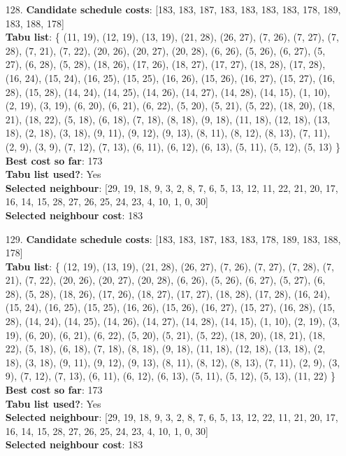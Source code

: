 \documentclass[fleqn]{article}
\begin{document}
\begin{itemize}
    \item[128.] \textbf{Candidate schedule costs}: [183, 183, 187, 183, 183, 183, 183, 178, 189, 183, 188, 178] \\
    \textbf{Tabu list}: \{ (11, 19), (12, 19), (13, 19), (21, 28), (26, 27), (7, 26), (7, 27), (7, 28), (7, 21), (7, 22), (20, 26), (20, 27), (20, 28), (6, 26), (5, 26), (6, 27), (5, 27), (6, 28), (5, 28), (18, 26), (17, 26), (18, 27), (17, 27), (18, 28), (17, 28), (16, 24), (15, 24), (16, 25), (15, 25), (16, 26), (15, 26), (16, 27), (15, 27), (16, 28), (15, 28), (14, 24), (14, 25), (14, 26), (14, 27), (14, 28), (14, 15), (1, 10), (2, 19), (3, 19), (6, 20), (6, 21), (6, 22), (5, 20), (5, 21), (5, 22), (18, 20), (18, 21), (18, 22), (5, 18), (6, 18), (7, 18), (8, 18), (9, 18), (11, 18), (12, 18), (13, 18), (2, 18), (3, 18), (9, 11), (9, 12), (9, 13), (8, 11), (8, 12), (8, 13), (7, 11), (2, 9), (3, 9), (7, 12), (7, 13), (6, 11), (6, 12), (6, 13), (5, 11), (5, 12), (5, 13) \} \\
    \textbf{Best cost so far}: 173 \\
    \textbf{Tabu list used?}: Yes \\
    \textbf{Selected neighbour}: [29, 19, 18, 9, 3, 2, 8, 7, 6, 5, 13, 12, 11, 22, 21, 20, 17, 16, 14, 15, 28, 27, 26, 25, 24, 23, 4, 10, 1, 0, 30] \\
    \textbf{Selected neighbour cost}: 183
      

    \item[129.] \textbf{Candidate schedule costs}: [183, 183, 187, 183, 183, 178, 189, 183, 188, 178] \\
    \textbf{Tabu list}: \{ (12, 19), (13, 19), (21, 28), (26, 27), (7, 26), (7, 27), (7, 28), (7, 21), (7, 22), (20, 26), (20, 27), (20, 28), (6, 26), (5, 26), (6, 27), (5, 27), (6, 28), (5, 28), (18, 26), (17, 26), (18, 27), (17, 27), (18, 28), (17, 28), (16, 24), (15, 24), (16, 25), (15, 25), (16, 26), (15, 26), (16, 27), (15, 27), (16, 28), (15, 28), (14, 24), (14, 25), (14, 26), (14, 27), (14, 28), (14, 15), (1, 10), (2, 19), (3, 19), (6, 20), (6, 21), (6, 22), (5, 20), (5, 21), (5, 22), (18, 20), (18, 21), (18, 22), (5, 18), (6, 18), (7, 18), (8, 18), (9, 18), (11, 18), (12, 18), (13, 18), (2, 18), (3, 18), (9, 11), (9, 12), (9, 13), (8, 11), (8, 12), (8, 13), (7, 11), (2, 9), (3, 9), (7, 12), (7, 13), (6, 11), (6, 12), (6, 13), (5, 11), (5, 12), (5, 13), (11, 22) \} \\
    \textbf{Best cost so far}: 173 \\
    \textbf{Tabu list used?}: Yes \\
    \textbf{Selected neighbour}: [29, 19, 18, 9, 3, 2, 8, 7, 6, 5, 13, 12, 22, 11, 21, 20, 17, 16, 14, 15, 28, 27, 26, 25, 24, 23, 4, 10, 1, 0, 30] \\
    \textbf{Selected neighbour cost}: 183
      


\end{itemize}
\end{document}

